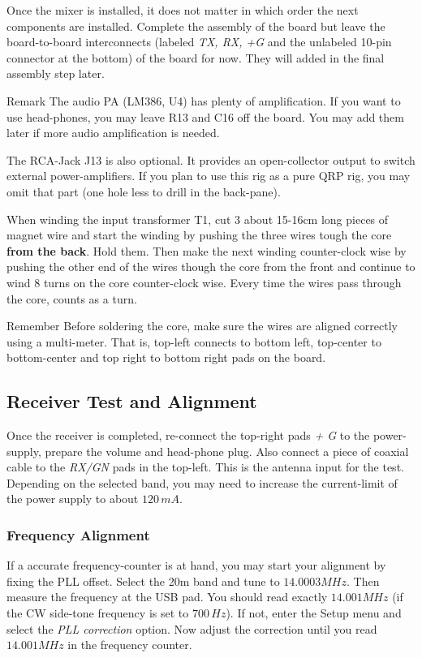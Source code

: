 \documentclass[10pt, a4paper]{scrartcl}
\newenvironment{remember}{\begin{bclogo}[couleur=blue!30,arrondi=.1,logo=\bccrayon,ombre=true]{Remember}}{\end{bclogo}}
\newenvironment{remark}{\begin{bclogo}[couleur=blue!30,arrondi=.1,logo=\bcinfo,ombre=true]{Remark}}{\end{bclogo}}
\begin{document}
Once the mixer is installed, it does not matter in which order the next components are installed. Complete the assembly of the board but leave the board-to-board interconnects (labeled \emph{TX, RX, +G} and the unlabeled 10-pin connector at the bottom) of the board for now. They will added in the final assembly step later.

\begin{remark}
The audio PA (LM386, U4) has plenty of amplification. If you want to use head-phones, you may leave R13 and C16 off the board. You may add them later if more audio amplification is needed.
\end{remark}

The RCA-Jack J13 is also optional. It provides an open-collector output to switch external power-amplifiers. If you plan to use this rig as a pure QRP rig, you may omit that part (one hole less to drill in the back-pane).

When winding the input transformer T1, cut 3 about 15-16cm long pieces of magnet wire and start the winding by pushing the three wires tough the core \textbf{from the back}. Hold them. Then make the next winding counter-clock wise by pushing the other end of the wires though the core from the front and continue to wind 8 turns on the core counter-clock wise. Every time the wires pass through the core, counts as a turn. 

\begin{remember}
Before soldering the core, make sure the wires are aligned correctly using a multi-meter. That is, top-left connects to bottom left, top-center to bottom-center and top right to bottom right pads on the board. 
\end{remember}

\subsection{Receiver Test and Alignment}
Once the receiver is completed, re-connect the top-right pads \emph{+ G} to the power-supply, prepare the volume and head-phone plug. Also connect a piece of coaxial cable to the \emph{RX/GN} pads in the top-left. This is the antenna input for the test. Depending on the selected band, you may need to increase the current-limit of the power supply to about $120\,mA$. 

\subsubsection{Frequency Alignment}
If a accurate frequency-counter is at hand, you may start your alignment by fixing the PLL offset. Select the 20m band and tune to $14.0003 MHz$. Then measure the frequency at the USB pad. You should read exactly $14.001 MHz$ (if the CW side-tone frequency is set to $700\,Hz$). If not, enter the Setup menu and select the \emph{PLL correction} option. Now adjust the correction until you read $14.001 MHz$ in the frequency counter.
\end{document}

